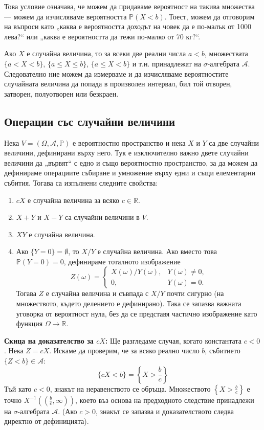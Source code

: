 Това условие означава, че можем да придаваме вероятност на такива множества — можем да изчисляваме вероятността $\mathbb{P}(X < b)$. Тоест, можем да отговорим на въпроси като „каква е вероятността доходът на човек да е по-малък от 1000 лева?“ или „каква е вероятността да тежи по-малко от 70 кг?“.

\begin{cor}
Ако $X$ е случайна величина, то за всеки две реални числа $a < b$, множествата $\{ a < X < b \}$, $\{ a \le X \le b \}$, $\{ a \le X < b \}$ и т.н. принадлежат на $\sigma$-алгебрата $\mathcal{A}$. Следователно ние можем да измерваме и да изчисляваме вероятностите случайната величина да попада в произволен интервал, бил той отворен, затворен, полуотворен или безкраен.
\end{cor}

\subsection{Операции със случайни величини}
Нека $V = (\Omega, \mathcal{A}, \mathbb{P})$ е вероятностно пространство и нека $X$ и $Y$ са две случайни величини, дефинирани върху него. Тук е изключително важно двете случайни величини да „вървят“ с едно и също вероятностно пространство, за да можем да дефинираме операциите събиране и умножение върху едни и същи елементарни събития. Тогава са изпълнени следните свойства:
\begin{enumerate}
    \item $c X$ е случайна величина за всяко $c \in \mathbb{R}$.
    \item $X + Y$ и $X - Y$ са случайни величини в $V$.
    \item $X Y$ е случайна величина.
    \item Ако $\{Y=0\}=\emptyset$, то $X/Y$ е случайна величина. Ако вместо това
    $\mathbb{P}(Y=0)=0$, дефинираме тоталното изображение
    \[
    Z(\omega)=
    \begin{cases}
    X(\omega)/Y(\omega),&Y(\omega)\ne0,\\
    0,&Y(\omega)=0.
    \end{cases}
    \]
    Тогава $Z$ е случайна величина и съвпада с $X/Y$ почти сигурно (на
    множеството, където делението е дефинирано). Така се запазва важната
    уговорка от вероятност нула, без да се представя частично изображение
    като функция $\Omega\to\mathbb{R}$.
\end{enumerate}

\textbf{Скица на доказателство за $c X$:}
Ще разгледаме случая, когато константата $c < 0$. Нека $Z = c X$. Искаме да проверим, че за всяко реално число $b$, събитието $\{ Z < b \} \in \mathcal{A}$:
\[ \{ c X < b \} = \left\{ X > \frac{b}{c} \right\} \]
Тъй като $c < 0$, знакът на неравенството се обръща. Множеството $\left\{ X > \frac{b}{c} \right\}$ е точно $X^{-1}\left(\left(\frac{b}{c}, \infty\right)\right)$, което въз основа на предходното следствие принадлежи на $\sigma$-алгебрата $\mathcal{A}$. (Ако $c > 0$, знакът се запазва и доказателството следва директно от дефиницията).

